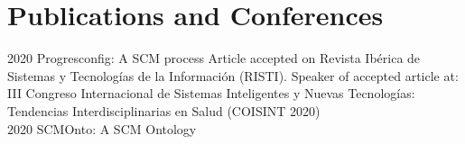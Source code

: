 \documentclass[american]{cv-class}
\begin{document}
\section{Publications and Conferences}
\begin{entrylist}
	\entry
	{2020}
	{Progresconfig: A SCM process}
	{ }
	{\justifying Article accepted on Revista Ibérica de Sistemas y Tecnologías de la Información (RISTI). Speaker of accepted article at: III Congreso Internacional de Sistemas Inteligentes y Nuevas Tecnologías: Tendencias Interdisciplinarias en Salud (COISINT 2020) \\
	{\href{https://bit.ly/3eUN9Ly}{}}
	}
	\entry
	{2020}
	{SCMOnto: A SCM Ontology}
	{ }

\end{entrylist}
\end{document}
